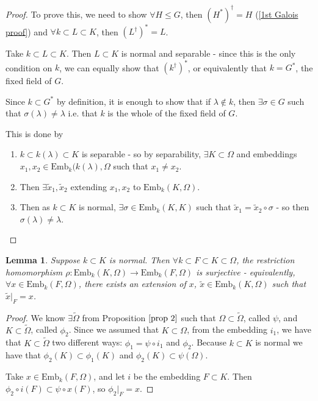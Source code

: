 \documentclass{article}
\theoremstyle{definition}
\theoremstyle{plain}%
\newtheorem{lem}[thm]{Lemma}
\theoremstyle{remark}
\newcommand{\Emb}{\text{Emb}}
\begin{document}
\begin{proof}
    To prove this, we need to show $\forall H \le G$, then $(H^{*})^\dagger = H$ (\ref{1st Galois proof}) and $\forall k \subset L \subset K$, then $(L^\dagger)^{*} = L$.
    
    Take $k \subset L \subset K$. Then $L \subset K$ is normal and separable - since this is the only condition on $k$, we can equally show that $(k^\dagger)^{*}$, or equivalently that $k = G^{*}$, the fixed field of $G$.
    
    Since $k \subset G^{*}$ by definition, it is enough to show that if $\lambda \not \in k$, then $\exists \sigma \in G$ such that $\sigma(\lambda) \ne \lambda$ i.e. that $k$ is the whole of the fixed field of $G$. 
    
    This is done by
    \begin{enumerate}
        \item $k \subset k(\lambda) \subset K$ is separable - so by separability, $\exists K \subset \Omega$ and embeddings $x_1, x_2 \in \Emb_k(k(\lambda), \Omega$ such that $x_1 \ne x_2$.
        \item Then $\exists \tilde x_1, \tilde x_2$ extending $x_1, x_2$ to $\Emb_k(K, \Omega)$.
        \item Then as $k \subset K$ is normal, $\exists \sigma \in \Emb_k(K, K)$ such that $\tilde x_1 = \tilde x_2 \circ \sigma$ - so then $\sigma(\lambda) \ne \lambda$.
    \end{enumerate}
\end{proof}

\begin{lem}
    Suppose $k \subset K$ is normal. Then $\forall k \subset F \subset K \subset \Omega$, the restriction homomorphism $\rho : \Emb_k(K, \Omega) \to \Emb_k(F, \Omega)$ is surjective - equivalently, $\forall x \in \Emb_k(F, \Omega)$, there exists an extension of $x$, $\tilde x \in \Emb_k(K, \Omega)$ such that $\tilde x|_F = x$.
\end{lem}

\begin{proof}
    We know $\exists \tilde \Omega$ from Proposition $\ref{prop 2}$ such that $\Omega \subset \tilde \Omega$, called $\psi$, and $K \subset \tilde \Omega$, called $\phi_2$. Since we assumed that $K \subset \Omega$, from the embedding $i_1$, we have that $K \subset \tilde \Omega$ two different ways: $\phi_1 = \psi \circ i_1$ and $\phi_2$. Because $k \subset K$ is normal we have that $\phi_2(K) \subset \phi_1(K)$ and $\phi_2(K) \subset \psi(\Omega)$. 
    
    Take $x \in \Emb_k(F, \Omega)$, and let $i$ be the embedding $F \subset K$. Then $\phi_2 \circ i (F) \subset \psi \circ x (F)$, so $\phi_2 |_{F} = x$.
\end{proof}
\end{document}
